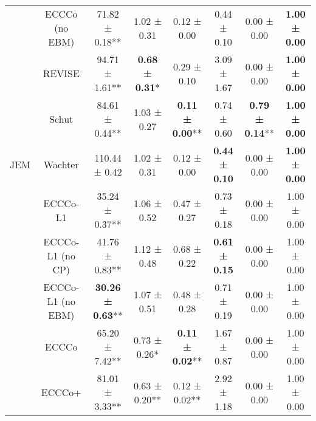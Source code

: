 \begin{table}
{\begin{tabular}[t]{cccccccc}
 & ECCCo (no EBM) & 71.82 ± 0.18** & 1.02 ± 0.31\hphantom{*}\hphantom{*} & 0.12 ± 0.00\hphantom{*}\hphantom{*} & 0.44 ± 0.10\hphantom{*}\hphantom{*} & 0.00 ± 0.00\hphantom{*}\hphantom{*} & \textbf{1.00 ± 0.00}\hphantom{*}\hphantom{*}\\

 & REVISE & 94.71 ± 1.61** & \textbf{0.68 ± 0.31}*\hphantom{*} & 0.29 ± 0.10\hphantom{*}\hphantom{*} & 3.09 ± 1.67\hphantom{*}\hphantom{*} & 0.00 ± 0.00\hphantom{*}\hphantom{*} & \textbf{1.00 ± 0.00}\hphantom{*}\hphantom{*}\\

 & Schut & 84.61 ± 0.44** & 1.03 ± 0.27\hphantom{*}\hphantom{*} & \textbf{0.11 ± 0.00}** & 0.74 ± 0.60\hphantom{*}\hphantom{*} & \textbf{0.79 ± 0.14}** & \textbf{1.00 ± 0.00}\hphantom{*}\hphantom{*}\\

\multirow[t]{-10}{*}{\centering\arraybackslash JEM} & Wachter & 110.44 ± 0.42\hphantom{*}\hphantom{*} & 1.02 ± 0.31\hphantom{*}\hphantom{*} & 0.12 ± 0.00\hphantom{*}\hphantom{*} & \textbf{0.44 ± 0.10}\hphantom{*}\hphantom{*} & 0.00 ± 0.00\hphantom{*}\hphantom{*} & \textbf{1.00 ± 0.00}\hphantom{*}\hphantom{*}\\
\cmidrule{1-8}
 & ECCCo-L1 & 35.24 ± 0.37** & 1.06 ± 0.52\hphantom{*}\hphantom{*} & 0.47 ± 0.27\hphantom{*}\hphantom{*} & 0.73 ± 0.18\hphantom{*}\hphantom{*} & 0.00 ± 0.00\hphantom{*}\hphantom{*} & 1.00 ± 0.00\hphantom{*}\hphantom{*}\\

 & ECCCo-L1 (no CP) & 41.76 ± 0.83** & 1.12 ± 0.48\hphantom{*}\hphantom{*} & 0.68 ± 0.22\hphantom{*}\hphantom{*} & \textbf{0.61 ± 0.15}\hphantom{*}\hphantom{*} & 0.00 ± 0.00\hphantom{*}\hphantom{*} & 1.00 ± 0.00\hphantom{*}\hphantom{*}\\

 & ECCCo-L1 (no EBM) & \textbf{30.26 ± 0.63}** & 1.07 ± 0.51\hphantom{*}\hphantom{*} & 0.48 ± 0.28\hphantom{*}\hphantom{*} & 0.71 ± 0.19\hphantom{*}\hphantom{*} & 0.00 ± 0.00\hphantom{*}\hphantom{*} & 1.00 ± 0.00\hphantom{*}\hphantom{*}\\

 & ECCCo & 65.20 ± 7.42** & 0.73 ± 0.26*\hphantom{*} & \textbf{0.11 ± 0.02}** & 1.67 ± 0.87\hphantom{*}\hphantom{*} & 0.00 ± 0.00\hphantom{*}\hphantom{*} & 1.00 ± 0.00\hphantom{*}\hphantom{*}\\

 & ECCCo+ & 81.01 ± 3.33** & 0.63 ± 0.20** & 0.12 ± 0.02** & 2.92 ± 1.18\hphantom{*}\hphantom{*} & 0.00 ± 0.00\hphantom{*}\hphantom{*} & 1.00 ± 0.00\hphantom{*}\hphantom{*}\\


\end{tabular}}
\end{table}
